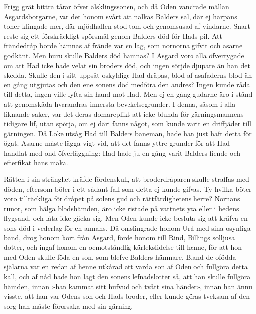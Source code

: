 Frigg grät bittra tårar öfver älsklingssonen, och då Oden vandrade
mällan Asgardsborgarne, var det honom svårt att nalkas Balders sal, där
ej harpans toner klingade mer, där mjödhallen stod tom och genomsusad af
vindarne. Snart reste sig ett förskräckligt spörsmål genom Balders död
för Hads pil. Att frändedråp borde hämnas af frände var en lag, som
nornorna gifvit och asarne godkänt. Men huru skulle Balders död hämnas?
I Asgard voro alla öfvertygade om att Had icke hade velat sin broders
död, och ingen sörjde djupare än han det skedda. Skulle den i sitt
uppsåt oskyldige Had dräpas, blod af asafaderns blod än en gång utgjutas
och den ene sonens död medföra den andres? Ingen kunde råda till
\protect\hypertarget{lb1625905.xhtmlux5cux23start90}{}{}\protect\hypertarget{lb1625905.xhtmlux5cux23start90-a}{}{}\protect\hypertarget{lb1625905.xhtmlux5cux23start90-b}{}{}\protect\hypertarget{lb1625905.xhtmlux5cux23start90-c}{}{}\protect\hypertarget{lb1625905.xhtmlux5cux23start90-d}{}{}
detta, ingen ville lyfta sin hand mot Had. Men ej en gång gudarne äro i
stånd att genomskåda hvarandras innersta bevekelsegrunder. I denna,
såsom i alla liknande saker, var det deras domareplikt att icke blunda
för gärningsmannens tidigare lif, utan spörja, om ej däri fanns något,
som kunde varit en driffjäder till gärningen. Då Loke utsåg Had till
Balders baneman, hade han just haft detta för ögat. Asarne måste lägga
vigt vid, att det fanns yttre grunder för att Had handlat med ond
öfverläggning: Had hade ju en gång varit Balders fiende och efterfikat
hans maka.

Rätten i sin stränghet kräfde fördenskull, att broderdråparen skulle
straffas med döden, eftersom böter i ett sådant fall som detta ej kunde
gifvas. Ty hvilka böter voro tillräckliga för dråpet på solens gud och
rättfärdighetens herre? Nornans runor, som hälga blodshämden, äro icke
ristade på vattnets yta eller i hedens flygsand, och låta icke gäcka
sig. Men Oden kunde icke besluta sig att kräfva en sons död i vederlag
för en annans. Då omslingrade honom Urd med sina osynliga band, drog
honom bort från Asgard, förde honom till Rind, Billings solljusa dotter,
och ingaf honom en oemotståndlig kärlekslidelse till henne, för att hon
med Oden skulle föda en son, som blefve Balders hämnare. Bland de ofödda
själarna var en redan af henne utkårad att varda son af Oden och
fullgöra detta kall, och af nåd hade hon lagt den sonens lefnadslotter
så, att han skulle fullgöra hämden, innan »han kammat sitt hufvud och
tvått sina händer», innan han ännu visste, att han var Odens son och
Hads broder, eller kunde göras tveksam af den sorg han måste förorsaka
med sin gärning.

